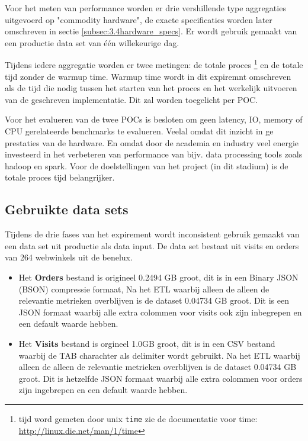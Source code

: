 Voor het meten van performance worden er drie vershillende type aggregaties uitgevoerd op "commodity hardware", de exacte specificaties worden later omschreven in sectie \ref{subsec:3.4hardware_specs}.  Er wordt gebruik gemaakt van een productie data set van één willekeurige dag.

Tijdens iedere aggregatie worden er twee metingen: de totale proces \footnote{tijd word gemeten door unix \verb#time# zie de documentatie voor time: \url{http://linux.die.net/man/1/time}} en de totale tijd zonder de warmup time.  Warmup time wordt in dit expiremnt omschreven als de tijd die nodig tussen het starten van het proces en het werkelijk uitvoeren van de geschreven implementatie. Dit zal worden toegelicht per POC.

Voor het evalueren van de twee POCs is besloten om geen latency, IO, memory of CPU gerelateerde benchmarks te evalueren. Veelal omdat dit inzicht in ge prestaties van de hardware. En omdat door de  academia en industry veel energie investeerd in het verbeteren van performance van bijv. data processing tools zoals hadoop en spark. Voor de doelstellingen van het project (in dit stadium) is de totale proces tijd belangrijker.


\subsection{Gebruikte data sets}

Tijdens de drie fases van het expirement wordt inconsistent gebruik gemaakt van een data set uit productie als data input. De data set bestaat uit visits en orders van 264 webwinkels uit de benelux.

\begin{itemize}
    \item Het \textbf{Orders} bestand is origineel 0.2494 GB groot, dit is in een Binary JSON (BSON) compressie formaat, Na het ETL waarbij alleen de alleen de relevantie metrieken overblijven is de dataset 0.04734 GB groot. Dit is een JSON formaat waarbij alle extra colommen voor visits ook zijn inbegrepen en een default waarde hebben.

    \item Het \textbf{Visits} bestand is orgineel 1.0GB groot, dit is in een CSV bestand waarbij de TAB charachter als delimiter wordt gebruikt.  Na het ETL waarbij alleen de alleen de relevantie metrieken overblijven is de dataset 0.04734 GB groot. Dit is hetzelfde JSON formaat waarbij alle extra colommen voor orders zijn ingebrepen en een default waarde hebben.
\end{itemize}

